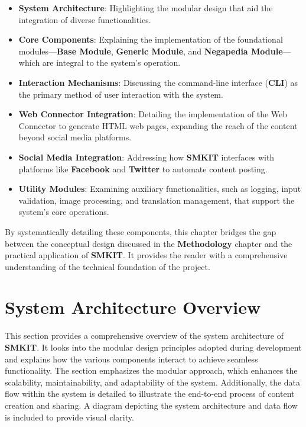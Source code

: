 \begin{itemize}
    \item \textbf{System Architecture}: Highlighting the modular design that aid the integration of diverse functionalities.
    \item \textbf{Core Components}: Explaining the implementation of the foundational modules—\textbf{Base Module}, \textbf{Generic Module}, and \textbf{Negapedia Module}—which are integral to the system's operation.
    \item \textbf{Interaction Mechanisms}: Discussing the command-line interface (\textbf{CLI}) as the primary method of user interaction with the system.
    \item \textbf{Web Connector Integration}: Detailing the implementation of the Web Connector to generate HTML web pages, expanding the reach of the content beyond social media platforms.
    \item \textbf{Social Media Integration}: Addressing how \textbf{SMKIT} interfaces with platforms like \textbf{Facebook} and \textbf{Twitter} to automate content posting.
    \item \textbf{Utility Modules}: Examining auxiliary functionalities, such as logging, input validation, image processing, and translation management, that support the system's core operations.
\end{itemize}

By systematically detailing these components, this chapter bridges the gap between the conceptual design discussed in the \textbf{Methodology} chapter and the practical application of \textbf{SMKIT}. It provides the reader with a comprehensive understanding of the technical foundation of the project.


\section{System Architecture Overview}
\label{sec:system_architecture_overview}
This section provides a comprehensive overview of the system architecture of \textbf{SMKIT}. It looks into the modular design principles adopted during development and explains how the various components interact to achieve seamless functionality. The section emphasizes the modular approach, which enhances the scalability, maintainability, and adaptability of the system. Additionally, the data flow within the system is detailed to illustrate the end-to-end process of content creation and sharing. A diagram depicting the system architecture and data flow is included to provide visual clarity.

